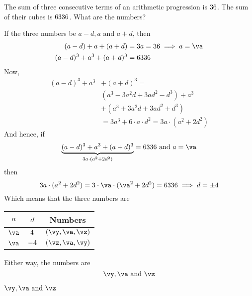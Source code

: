 



\DIVIDE{}\va
\SUBTRACT\va\vd\vy
\ADD\va\vd\vz

\question[3] The sum of three consecutive terms of an arithmetic progression is $36$. 
The sum of their cubes is $6336$. What are the numbers?

\watchout

\begin{solution}[\halfpage]
  If the three numbers be $a-d, a$ and $a+d$, then 
  \begin{align}
    (a-d) + a + (a+d) &= 3a = \vs\implies a = \va\\
    (a-d)^3 + a^3 + (a+d)^3 &= \vc
  \end{align}
  Now, 
  \begin{align}
    (a-d)^3 + a^3 &+ (a+d)^3 = \nonumber \\
                  &(a^3-3a^2 d + 3ad^2 - d^3) + a^3 \nonumber \\
                  &+ (a^3+3a^2 d+3ad^2+d^3) \\
                  &= 3a^3 + 6\cdot a\cdot d^2 = 3a\cdot( a^2 + 2d^2)  
  \end{align}
  And hence, if 
  \[ \underbrace{(a-d)^3 + a^3 + (a+d)^3}_{3a\cdot(a^2+2d^2)} = \vc\text{ and } a = \va \]
  then 
  \[ 3a\cdot(a^2+2d^2) = 3\cdot\va\cdot(\va^2 + 2d^2) = \vc\implies d = \pm\vd \] 
  Which means that the three numbers are 

  \begin{tabular}{c c c}
    \toprule
      $a$ & $d$ & Numbers \\ 
    \midrule
      $\va$ & $4$ & $(\vy,\va,\vz)$ \\
      $\va$ & $-4$ & $(\vz,\va,\vy)$ \\
    \bottomrule
  \end{tabular}

  Either way, the numbers are
  \[ \vy, \va\text{ and } \vz \]
\end{solution}
\ifprintanswers\begin{codex}
  $\vy, \va\text{ and } \vz$
\end{codex}\fi
